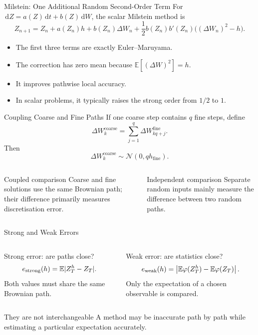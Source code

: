 \documentclass[aspectratio=169,10pt]{beamer}
\newcommand{\E}{\mathbb{E}}
\newcommand{\dd}{\,\mathrm{d}}
\newcommand{\Normal}{\mathcal{N}}
\begin{document}
\begin{frame}{Milstein: One Additional Random Second-Order Term}
  For $\dd Z=a(Z)\dd t+b(Z)\dd W$, the scalar Milstein method is
  \[
    \boxed{
    Z_{n+1}=Z_n+a(Z_n)h+b(Z_n)\Delta W_n
    +\frac12 b(Z_n)b'(Z_n)\bigl((\Delta W_n)^2-h\bigr)}.
  \]
  \begin{itemize}
    \item The first three terms are exactly Euler--Maruyama.
    \item The correction has zero mean because $\E[(\Delta W)^2]=h$.
    \item It improves pathwise local accuracy.
    \item In scalar problems, it typically raises the strong order from $1/2$ to $1$.
  \end{itemize}
\end{frame}

\begin{frame}{Coupling Coarse and Fine Paths}
  If one coarse step contains $q$ fine steps, define
  \[
    \Delta W^{\mathrm{coarse}}_k
      =\sum_{j=1}^{q}\Delta W^{\mathrm{fine}}_{kq+j}.
  \]
  Then
  \[
    \Delta W^{\mathrm{coarse}}_k\sim\Normal(0,qh_{\mathrm{fine}}).
  \]
  \begin{columns}[T]
      \begin{block}{Coupled comparison}
        Coarse and fine solutions use the same Brownian path; their difference
        primarily measures discretisation error.
      \end{block}
      \begin{block}{Independent comparison}
        Separate random inputs mainly measure the difference between two random paths.
      \end{block}
  \end{columns}
\end{frame}

\begin{frame}{Strong and Weak Errors}
  \begin{columns}[T]
    \begin{block}{Strong error: are paths close?}
      \[
        e_{\rm strong}(h)=\E|Z_T^h-Z_T|.
      \]
      Both values must share the same Brownian path.
    \end{block}
    \begin{block}{Weak error: are statistics close?}
      \[
        e_{\rm weak}(h)=
        \left|\E\varphi(Z_T^h)-\E\varphi(Z_T)\right|.
      \]
      Only the expectation of a chosen observable is compared.
    \end{block}
  \end{columns}
  \begin{alertblock}{They are not interchangeable}
    A method may be inaccurate path by path while estimating a particular expectation accurately.
  \end{alertblock}
\end{frame}
\end{document}

